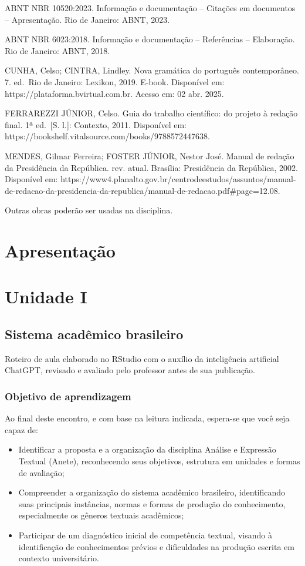 \documentclass[
  letterpaper,
  DIV=11,
  numbers=noendperiod]{scrreprt}
\providecommand{\tightlist}{%
  \setlength{\itemsep}{0pt}\setlength{\parskip}{0pt}}
\begin{document}
ABNT NBR 10520:2023. Informação e documentação -- Citações em documentos
-- Apresentação. Rio de Janeiro: ABNT, 2023.

ABNT NBR 6023:2018. Informação e documentação -- Referências --
Elaboração. Rio de Janeiro: ABNT, 2018.

CUNHA, Celso; CINTRA, Lindley. Nova gramática do português
contemporâneo. 7. ed.~Rio de Janeiro: Lexikon, 2019. E-book. Disponível
em: https://plataforma.bvirtual.com.br. Acesso em: 02 abr. 2025.

FERRAREZZI JÚNIOR, Celso. Guia do trabalho científico: do projeto à
redação final. 1ª ed.~{[}S. l.{]}: Contexto, 2011. Disponível em:
https://bookshelf.vitalsource.com/books/9788572447638.

MENDES, Gilmar Ferreira; FOSTER JÚNIOR, Nestor José. Manual de redação
da Presidência da República. rev. atual. Brasília: Presidência da
República, 2002. Disponível em:
https://www4.planalto.gov.br/centrodeestudos/assuntos/manual-de-redacao-da-presidencia-da-republica/manual-de-redacao.pdf\#page=12.08.

Outras obras poderão ser usadas na disciplina.

\part{Apresentação}

\part{Unidade I}

\chapter{Sistema acadêmico
brasileiro}\label{sistema-acaduxeamico-brasileiro}

Roteiro de aula elaborado no RStudio com o auxílio da inteligência
artificial ChatGPT, revisado e avaliado pelo professor antes de sua
publicação.

\section{Objetivo de aprendizagem}\label{objetivo-de-aprendizagem}

Ao final deste encontro, e com base na leitura indicada, espera-se que
você seja capaz de:

\begin{itemize}
\tightlist
\item
  Identificar a proposta e a organização da disciplina Análise e
  Expressão Textual (Anete), reconhecendo seus objetivos, estrutura em
  unidades e formas de avaliação;
\item
  Compreender a organização do sistema acadêmico brasileiro,
  identificando suas principais instâncias, normas e formas de produção
  do conhecimento, especialmente os gêneros textuais acadêmicos;
\item
  Participar de um diagnóstico inicial de competência textual, visando à
  identificação de conhecimentos prévios e dificuldades na produção
  escrita em contexto universitário.
\end{itemize}
\end{document}
